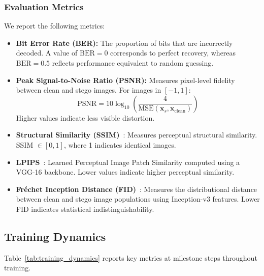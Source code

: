 \documentclass[conference]{IEEEtran}
\begin{document}
\subsubsection{Evaluation Metrics}
We report the following metrics:
\begin{itemize}[itemsep=1pt, topsep=2pt]
    \item \textbf{Bit Error Rate (BER):} The proportion of bits that are incorrectly decoded. A value of $\text{BER} = 0$ corresponds to perfect recovery, whereas $\text{BER} = 0.5$ reflects performance equivalent to random guessing.
    \item \textbf{Peak Signal-to-Noise Ratio (PSNR):} Measures pixel-level fidelity between clean and stego images. For images in $[-1, 1]$:
    \begin{equation}
        \text{PSNR} = 10 \log_{10}\!\left(\frac{4}{\text{MSE}(\mathbf{x}_s, \mathbf{x}_\text{clean})}\right)
    \end{equation}
    Higher values indicate less visible distortion.
    \item \textbf{Structural Similarity (SSIM)}~\cite{wang2004image}: Measures perceptual structural similarity. SSIM $\in [0, 1]$, where 1 indicates identical images.
    \item \textbf{LPIPS}~\cite{zhang2018unreasonable}: Learned Perceptual Image Patch Similarity computed using a VGG-16 backbone. Lower values indicate higher perceptual similarity.
    \item \textbf{Fr\'{e}chet Inception Distance (FID)}~\cite{heusel2017gans}: Measures the distributional distance between clean and stego image populations using Inception-v3 features. Lower FID indicates statistical indistinguishability.
\end{itemize}

\subsection{Training Dynamics}
\label{sec:dynamics}

Table~\ref{tab:training_dynamics} reports key metrics at milestone steps throughout training.
\end{document}
